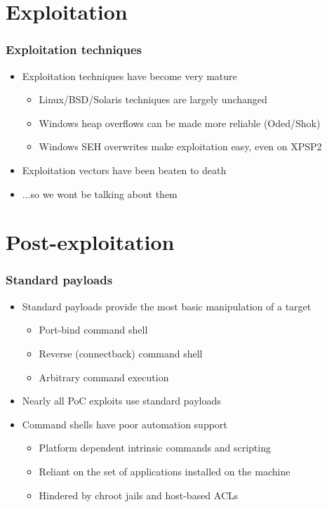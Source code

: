 \documentclass{beamer}
\newenvironment{sitemize}{\vspace{1mm}\begin{itemize}\itemsep 4pt\small}{\end{itemize}}
\begin{document}
\section{Exploitation}
\begin{frame}[t]
    \frametitle{Exploitation techniques}

    \begin{sitemize}
        \item Exploitation techniques have become very mature
        \begin{sitemize}
            \item Linux/BSD/Solaris techniques are largely unchanged
            \item Windows heap overflows can be made more reliable (Oded/Shok)
            \item Windows SEH overwrites make exploitation easy, even on XPSP2
        \end{sitemize}

        \pause
        \item Exploitation vectors have been beaten to death
        \pause
        \item ...so we wont be talking about them
    \end{sitemize}
\end{frame}

\section{Post-exploitation}
\begin{frame}[t]
    \frametitle{Standard payloads}

    \begin{sitemize}
        \item Standard payloads provide the most basic manipulation
        of a target
        \begin{sitemize}
            \item Port-bind command shell
            \item Reverse (connectback) command shell
            \item Arbitrary command execution
        \end{sitemize}

        \pause
        \item Nearly all PoC exploits use standard payloads

        \pause
        \item Command shells have poor automation support
        \begin{sitemize}
            \item Platform dependent intrinsic commands and
            scripting
            \item Reliant on the set of applications installed on the
            machine
            \item Hindered by chroot jails and host-based ACLs
        \end{sitemize}
    \end{sitemize}
\end{frame}
\end{document}

